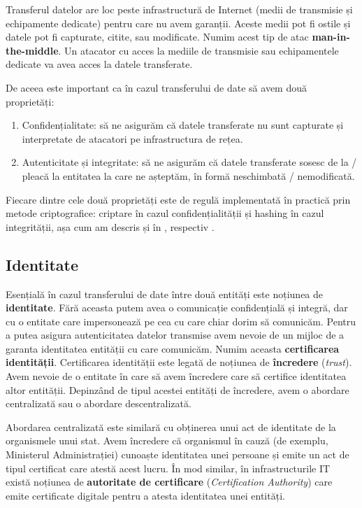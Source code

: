 Transferul datelor are loc peste infrastructură de Internet (medii de transmisie și echipamente dedicate) pentru care nu avem garanții.
Aceste medii pot fi ostile și datele pot fi capturate, citite, sau modificate.
Numim acest tip de atac \textbf{man-in-the-middle}.
Un atacator cu acces la mediile de transmisie sau echipamentele dedicate va avea acces la datele transferate.

De aceea este important ca în cazul transferului de date să avem două proprietăți:

\begin{enumerate}
  \item Confidențialitate: să ne asigurăm că datele transferate nu sunt capturate și interpretate de atacatori pe infrastructura de rețea.
  \item Autenticitate și integritate: să ne asigurăm că datele transferate sosesc de la / pleacă la entitatea la care ne așteptăm, în formă neschimbată / nemodificată.
\end{enumerate}

Fiecare dintre cele două proprietăți este de regulă implementată în practică prin metode criptografice: criptare în cazul confidențialității și hashing în cazul integrității, așa cum am descris și în , respectiv .

\subsection{Identitate}
\label{sec:sec:transfer:identity}

Esențială în cazul transferului de date între două entități este noțiunea de \textbf{identitate}.
Fără aceasta putem avea o comunicație confidențială și integră, dar cu o entitate care impersonează pe cea cu care chiar dorim să comunicăm.
Pentru a putea asigura autenticitatea datelor transmise avem nevoie de un mijloc de a garanta identitatea entității cu care comunicăm.
Numim aceasta \textbf{certificarea identității}.
Certificarea identității este legată de noțiunea de \textbf{încredere} (\textit{trust}).
Avem nevoie de o entitate în care să avem încredere care să certifice identitatea altor entității.
Depinzând de tipul acestei entități de încredere, avem o abordare centralizată sau o abordare descentralizată.

Abordarea centralizată este similară cu obținerea unui act de identitate de la organismele unui stat.
Avem încredere că organismul în cauză (de exemplu, Ministerul Administrației) cunoaște identitatea unei persoane și emite un act de tipul certificat care atestă acest lucru.
În mod similar, în infrastructurile IT există noțiunea de \textbf{autoritate de certificare} (\textit{Certification Authority}) care emite certificate digitale pentru a atesta identitatea unei entități.

